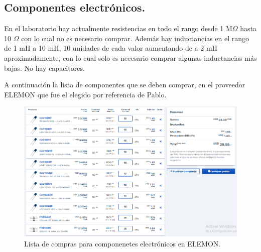 \subsection*{Componentes electrónicos.}
En el laboratorio hay actualmente resistencias en todo el rango desde 1 M$\Omega$ hasta 10 $\Omega$ con lo cual no es necesario comprar. Además hay inductancias en el rango de 1 mH a 10 mH, 10 unidades de cada valor aumentando de a 2 mH aproximadamente, con lo cual solo es necesario comprar algunas inductancias más bajas. No hay capacitores.

A continuación la lista de componentes que se deben comprar, en el proveedor ELEMON que fue el elegido por referencia de Pablo. %

\begin{figure}[!ht]
	\centering
	\includegraphics[width=\linewidth]{"Figures/21_04_2025/Lista de compras ELEMON"}
	\caption{Lista de compras para componenetes electrónicos en ELEMON.}
	\label{fig:lista-de-compras-elemon}
\end{figure}

